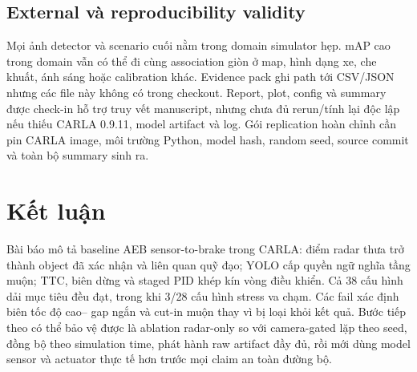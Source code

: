 \documentclass[conference]{IEEEtran}
\begin{document}
\subsection{External và reproducibility validity}
Mọi ảnh detector và scenario cuối nằm trong domain simulator hẹp. mAP cao trong
domain vẫn có thể đi cùng association giòn ở map, hình dạng xe, che khuất, ánh
sáng hoặc calibration khác. Evidence pack ghi path tới CSV/JSON nhưng các file
này không có trong checkout. Report, plot, config và summary được check-in hỗ trợ
truy vết manuscript, nhưng chưa đủ rerun/tính lại độc lập nếu thiếu CARLA 0.9.11,
model artifact và log. Gói replication hoàn chỉnh cần pin CARLA image, môi
trường Python, model hash, random seed, source commit và toàn bộ summary sinh ra.

\section{Kết luận}
Bài báo mô tả baseline AEB sensor-to-brake trong CARLA: điểm radar thưa trở thành
object đã xác nhận và liên quan quỹ đạo; YOLO cấp quyền ngữ nghĩa tầng muộn; TTC,
biên dừng và staged PID khép kín vòng điều khiển. Cả 38 cấu hình dải mục tiêu đều
đạt, trong khi 3/28 cấu hình stress va chạm. Các fail xác định biên tốc độ cao--
gap ngắn và cut-in muộn thay vì bị loại khỏi kết quả. Bước tiếp theo có thể bảo
vệ được là ablation radar-only so với camera-gated lặp theo seed, đồng bộ theo
simulation time, phát hành raw artifact đầy đủ, rồi mới dùng model sensor và
actuator thực tế hơn trước mọi claim an toàn đường bộ.

\balance


\end{document}
